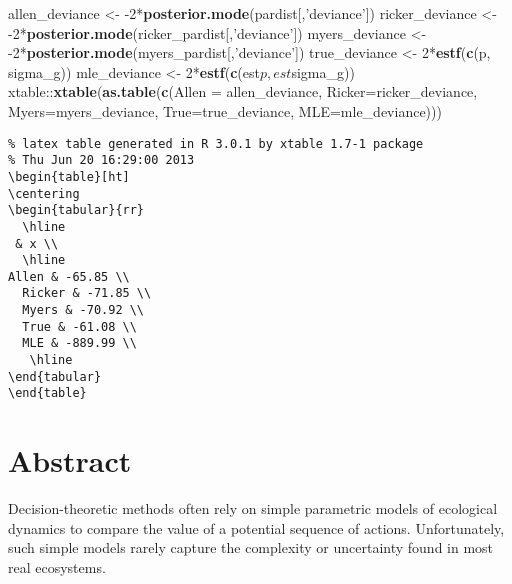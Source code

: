 \documentclass[author-year, review]{elsarticle} %
\newenvironment{Shaded}{}{}
\newcommand{\KeywordTok}[1]{\textcolor[rgb]{0.00,0.44,0.13}{\textbf{{#1}}}}
\newcommand{\DataTypeTok}[1]{\textcolor[rgb]{0.56,0.13,0.00}{{#1}}}
\newcommand{\DecValTok}[1]{\textcolor[rgb]{0.25,0.63,0.44}{{#1}}}
\newcommand{\StringTok}[1]{\textcolor[rgb]{0.25,0.44,0.63}{{#1}}}
\newcommand{\NormalTok}[1]{{#1}}
\begin{document}
\begin{Shaded}
\begin{Highlighting}[]
\NormalTok{allen_deviance <- -}\DecValTok{2}\NormalTok{*}\KeywordTok{posterior.mode}\NormalTok{(pardist[,}\StringTok{'deviance'}\NormalTok{])}
\NormalTok{ricker_deviance <- -}\DecValTok{2}\NormalTok{*}\KeywordTok{posterior.mode}\NormalTok{(ricker_pardist[,}\StringTok{'deviance'}\NormalTok{])}
\NormalTok{myers_deviance <- -}\DecValTok{2}\NormalTok{*}\KeywordTok{posterior.mode}\NormalTok{(myers_pardist[,}\StringTok{'deviance'}\NormalTok{])}
\NormalTok{true_deviance <- }\DecValTok{2}\NormalTok{*}\KeywordTok{estf}\NormalTok{(}\KeywordTok{c}\NormalTok{(p, sigma_g))}
\NormalTok{mle_deviance <- }\DecValTok{2}\NormalTok{*}\KeywordTok{estf}\NormalTok{(}\KeywordTok{c}\NormalTok{(est$p, est$sigma_g))}
\NormalTok{xtable::}\KeywordTok{xtable}\NormalTok{(}\KeywordTok{as.table}\NormalTok{(}\KeywordTok{c}\NormalTok{(}\DataTypeTok{Allen =} \NormalTok{allen_deviance, }\DataTypeTok{Ricker=}\NormalTok{ricker_deviance, }\DataTypeTok{Myers=}\NormalTok{myers_deviance, }\DataTypeTok{True=}\NormalTok{true_deviance, }\DataTypeTok{MLE=}\NormalTok{mle_deviance)))}
\end{Highlighting}
\end{Shaded}

\begin{verbatim}
% latex table generated in R 3.0.1 by xtable 1.7-1 package
% Thu Jun 20 16:29:00 2013
\begin{table}[ht]
\centering
\begin{tabular}{rr}
  \hline
 & x \\ 
  \hline
Allen & -65.85 \\ 
  Ricker & -71.85 \\ 
  Myers & -70.92 \\ 
  True & -61.08 \\ 
  MLE & -889.99 \\ 
   \hline
\end{tabular}
\end{table}
\end{verbatim}

\section{Abstract}

Decision-theoretic methods often rely on simple parametric models of
ecological dynamics to compare the value of a potential sequence of
actions. Unfortunately, such simple models rarely capture the complexity
or uncertainty found in most real ecosystems.
\end{document}
